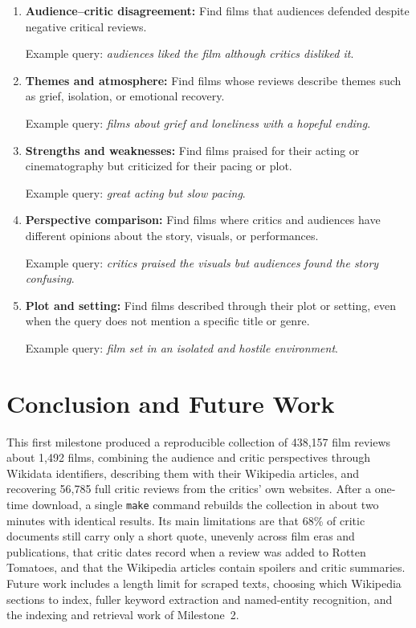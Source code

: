 \begin{enumerate}[leftmargin=*]
  \item \textbf{Audience--critic disagreement:} Find films that audiences defended despite negative critical reviews.

    Example query: \emph{audiences liked the film although critics disliked it}.

  \item \textbf{Themes and atmosphere:} Find films whose reviews describe themes such as grief, isolation, or emotional recovery.

    Example query: \emph{films about grief and loneliness with a hopeful ending}.

  \item \textbf{Strengths and weaknesses:} Find films praised for their acting or cinematography but criticized for their pacing or plot.

    Example query: \emph{great acting but slow pacing}.

  \item \textbf{Perspective comparison:} Find films where critics and audiences have different opinions about the story, visuals, or performances.

    Example query: \emph{critics praised the visuals but audiences found the story confusing}.

  \item \textbf{Plot and setting:} Find films described through their plot or setting, even when the query does not mention a specific title or genre.

    Example query: \emph{film set in an isolated and hostile environment}.
\end{enumerate}

\section{Conclusion and Future Work}
This first milestone produced a reproducible collection of 438,157 film reviews about 1,492 films, combining the audience and critic perspectives through Wikidata identifiers, describing them with their Wikipedia articles, and recovering 56,785 full critic reviews from the critics' own websites. After a one-time download, a single \texttt{make} command rebuilds the collection in about two minutes with identical results. Its main limitations are that 68\% of critic documents still carry only a short quote, unevenly across film eras and publications, that critic dates record when a review was added to Rotten Tomatoes, and that the Wikipedia articles contain spoilers and critic summaries. Future work includes a length limit for scraped texts, choosing which Wikipedia sections to index, fuller keyword extraction and named-entity recognition, and the indexing and retrieval work of Milestone~2.

